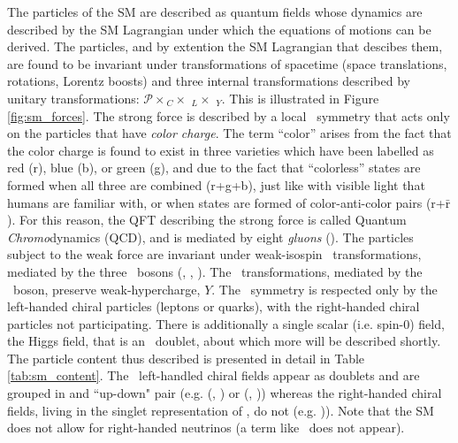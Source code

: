 The particles of the SM are described as quantum fields whose dynamics are
described by the SM Lagrangian under which the equations of motions can be derived.
The particles, and by extention the SM Lagrangian that descibes them, are found to be invariant under transformations of spacetime 
(space translations, rotations, Lorentz boosts) and three internal transformations described by unitary transformations: $\mathcal{P} \times$\SUthree$_C \times $ \SUtwo$_L \times$ \Uone$_{Y}$.
This is illustrated in Figure \ref{fig:sm_forces}. The strong force is described by a
local \SUthree~symmetry that acts only on the particles that have \textit{color charge}.
The term ``color'' arises from the fact that the color charge is found to exist
in three varieties which have been labelled as red (r), blue (b), or green (g), and due
to the fact that ``colorless'' states are formed when all three are combined (r+g+b), just
like with visible light that humans are familiar with, or when states are formed of color-anti-color
pairs (r+$\bar{\text{r}}$). For this reason, the QFT describing the strong force is called
Quantum \textit{Chromo}dynamics (QCD), and is mediated by eight \textit{gluons} (\fieldG).
The particles subject to the weak force are invariant under weak-isospin \SUtwo~transformations,
mediated by the three  \fieldW~bosons (\fieldWone, \fieldWtwo, \fieldWthree).
The \Uone~transformations, mediated by the \fieldB~boson, preserve weak-hypercharge, $Y$.
The \SUtwo~symmetry is respected only by the left-handed chiral
particles (leptons or quarks), with the right-handed chiral particles not participating.
There is additionally a single scalar (i.e. spin-0) field, the Higgs field, that is an \SUtwo~doublet, about which more will be described shortly.
The particle content thus described is presented in detail in Table \ref{tab:sm_content}.
The \SUtwo~left-handled chiral fields appear as doublets and are grouped in
and ``up-down" pair (e.g. (\fieldUl, \fieldDl) or (\fieldEl, \fieldNuEl)) whereas the right-handed chiral fields,
living in the singlet representation of \SUtwo, do not (e.g. \fieldUr)). Note
that the SM does not allow for right-handed neutrinos (a term like \fieldNuR~does not appear).

